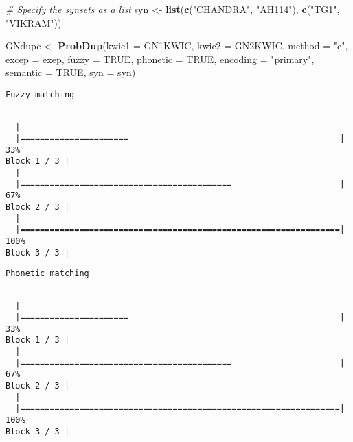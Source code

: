 \documentclass[]{article}
\newenvironment{Shaded}{\begin{snugshade}}{\end{snugshade}}
\newcommand{\CommentTok}[1]{\textcolor[rgb]{0.56,0.35,0.01}{\textit{#1}}}
\newcommand{\DataTypeTok}[1]{\textcolor[rgb]{0.13,0.29,0.53}{#1}}
\newcommand{\KeywordTok}[1]{\textcolor[rgb]{0.13,0.29,0.53}{\textbf{#1}}}
\newcommand{\NormalTok}[1]{#1}
\newcommand{\OtherTok}[1]{\textcolor[rgb]{0.56,0.35,0.01}{#1}}
\newcommand{\StringTok}[1]{\textcolor[rgb]{0.31,0.60,0.02}{#1}}
\begin{document}
\begin{Shaded}
\begin{Highlighting}[]
\CommentTok{# Specify the synsets as a list}
\NormalTok{syn <-}\StringTok{ }\KeywordTok{list}\NormalTok{(}\KeywordTok{c}\NormalTok{(}\StringTok{"CHANDRA"}\NormalTok{, }\StringTok{"AH114"}\NormalTok{), }\KeywordTok{c}\NormalTok{(}\StringTok{"TG1"}\NormalTok{, }\StringTok{"VIKRAM"}\NormalTok{))}
\end{Highlighting}
\end{Shaded}

\begin{Shaded}
\begin{Highlighting}[]
\NormalTok{GNdupc <-}\StringTok{ }\KeywordTok{ProbDup}\NormalTok{(}\DataTypeTok{kwic1 =}\NormalTok{ GN1KWIC, }\DataTypeTok{kwic2 =}\NormalTok{ GN2KWIC, }\DataTypeTok{method =} \StringTok{"c"}\NormalTok{,}
                  \DataTypeTok{excep =}\NormalTok{ exep, }\DataTypeTok{fuzzy =} \OtherTok{TRUE}\NormalTok{, }\DataTypeTok{phonetic =} \OtherTok{TRUE}\NormalTok{,}
                  \DataTypeTok{encoding =} \StringTok{"primary"}\NormalTok{, }\DataTypeTok{semantic =} \OtherTok{TRUE}\NormalTok{, }\DataTypeTok{syn =}\NormalTok{ syn)}
\end{Highlighting}
\end{Shaded}

\begin{verbatim}
Fuzzy matching
\end{verbatim}

\begin{verbatim}

  |                                                                       
  |======================                                           |  33%
Block 1 / 3 |
  |                                                                       
  |===========================================                      |  67%
Block 2 / 3 |
  |                                                                       
  |=================================================================| 100%
Block 3 / 3 |
\end{verbatim}

\begin{verbatim}
Phonetic matching
\end{verbatim}

\begin{verbatim}

  |                                                                       
  |======================                                           |  33%
Block 1 / 3 |
  |                                                                       
  |===========================================                      |  67%
Block 2 / 3 |
  |                                                                       
  |=================================================================| 100%
Block 3 / 3 |
\end{verbatim}
\end{document}
